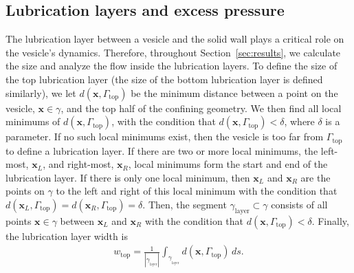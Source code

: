 \documentclass[twoside,twocolumn,9pt]{article}
\newcommand{\xx}{\mathbf{x}}
\newcommand{\yy}{\mathbf{y}}
\begin{document}
\subsection{\label{sec:LL} Lubrication layers and excess pressure}
The lubrication layer between a vesicle and the solid wall plays a
critical role on the vesicle's dynamics. Therefore, throughout
Section~\ref{sec:results}, we calculate the size and analyze the flow
inside the lubrication layers. 
%
To define the size of the top lubrication layer (the size of the bottom
lubrication layer is defined similarly), we let
$d(\xx,\Gamma_\mathrm{top})$ be the minimum distance between a point on
the vesicle, $\xx \in \gamma$, and the top half of the confining
geometry.
We then find all local minimums of $d(\xx,\Gamma_\mathrm{top})$, with
the condition that $d(\xx,\Gamma_\mathrm{top}) < \delta$, where $\delta$
is a parameter. If no such local minimums exist, then the vesicle is too
far from $\Gamma_\mathrm{top}$ to define a lubrication layer. If there
are two or more local minimums, the left-most, $\xx_L$, and right-most,
$\xx_R$, local minimums form the start and end of the lubrication layer.
If there is only one local minimum, then $\xx_L$ and $\xx_R$ are the
points on $\gamma$ to the left and right of this local minimum with the
condition that $d(\xx_L,\Gamma_\mathrm{top}) =
d(\xx_R,\Gamma_\mathrm{top}) = \delta$. Then, the segment
$\gamma_{\mathrm{layer}} \subset \gamma$ consists of all points $\xx \in
\gamma$ between $\xx_L$ and $\xx_R$ with the condition that
$d(\xx,\Gamma_\mathrm{top}) < \delta$. Finally, the lubrication layer
width is
\begin{align}
    w_\mathrm{top} = \frac{1}{|\gamma_{_\mathrm{layer}}|} 
      \int_{\gamma_{_\mathrm{layer}}} d(\xx,\Gamma_\mathrm{top}) \, ds.
\end{align}
\end{document}
